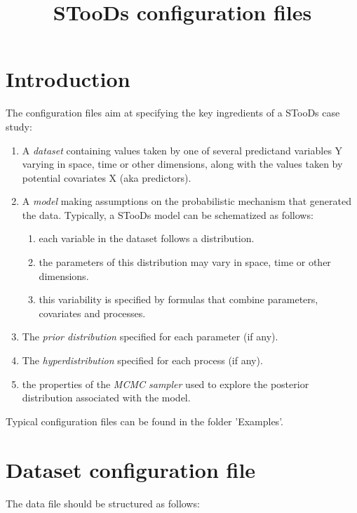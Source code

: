 \documentclass[a4paper]{article}
\title{STooDs configuration files}
\begin{document}
	
	\maketitle
	
	\section{Introduction}
	
	The configuration files aim at specifying the key ingredients of a STooDs case study:
	\begin{enumerate}
		\item A \textit{dataset} containing values taken by one of several predictand variables Y varying in space, time or other dimensions, along with the values taken by potential covariates X (aka predictors).
		\item A \textit{model} making assumptions on the probabilistic mechanism that generated the data. Typically, a STooDs model can be schematized as follows: 
			\begin{enumerate}
				\item each variable in the dataset follows a distribution.
				\item the parameters of this distribution may vary in space, time or other dimensions.
				\item this variability is specified by formulas that combine parameters, covariates and processes.
			\end{enumerate}
		\item The \textit{prior distribution} specified for each parameter (if any).
		\item The \textit{hyperdistribution} specified for each process (if any).
		\item the properties of the \textit{MCMC sampler} used to explore the posterior distribution associated with the model.		
	\end{enumerate}
	
	Typical configuration files can be found in the folder 'Examples'.
	
	\section{Dataset configuration file}
		
	The data file should be structured as follows:
		
\end{document}
